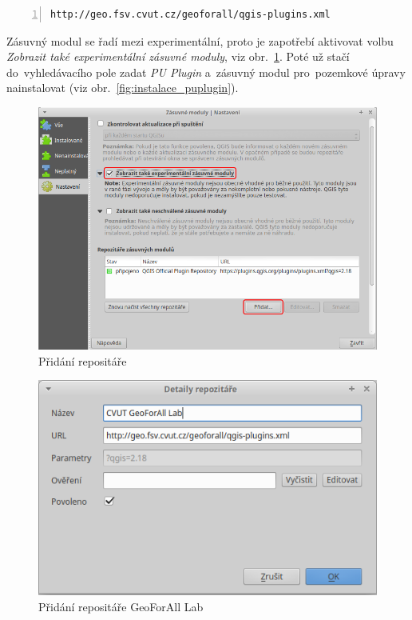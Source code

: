 \begin{lstlisting}[basicstyle=\footnotesize\ttfamily, backgroundcolor = \color{light-gray},  numbers=left, columns=fullflexible]
http://geo.fsv.cvut.cz/geoforall/qgis-plugins.xml
\end{lstlisting}

Zásuvný modul se řadí mezi experimentální, proto je zapotřebí aktivovat volbu \textit{Zobrazit také experimentální zásuvné moduly}, viz obr.~\ref{fig:pridani_repozitare}. Poté už stačí do~vyhledávacího pole zadat \textit{PU Plugin} a~zásuvný modul pro~pozemkové úpravy nainstalovat (viz obr.~\ref{fig:instalace_puplugin}).

	\begin{figure}[H]
		\centering
		\includegraphics[width=.9\textwidth]{./pictures/pridani_repozitare.png}
		\caption[Přidání repositáře]{Přidání repositáře}
		\label{fig:pridani_repozitare}
 	\end{figure}
 	
	\begin{figure}[H]
		\centering
		\includegraphics[width=.6\textwidth]{./pictures/pridani_repozitare-geoforall_lab.png}
		\caption[Přidání repositáře GeoForAll Lab]{Přidání repositáře GeoForAll Lab}
		\label{fig:pridani_repozitare_geoforall_lab}
 	\end{figure}

